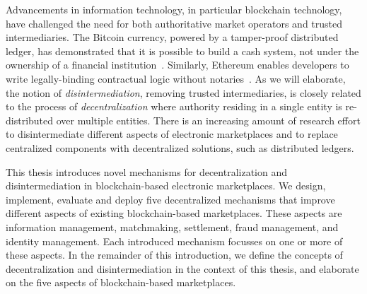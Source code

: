 Advancements in information technology, in particular blockchain technology, have challenged the need for both authoritative market operators and trusted intermediaries.
The Bitcoin currency, powered by a tamper-proof distributed ledger, has demonstrated that it is possible to build a cash system, not under the ownership of a financial institution~\cite{nakamoto2008bitcoin}.
Similarly, Ethereum enables developers to write legally-binding contractual logic without notaries~\cite{wood2014ethereum}.
As we will elaborate, the notion of \emph{disintermediation}, removing trusted intermediaries, is closely related to the process of \emph{decentralization} where authority residing in a single entity is re-distributed over multiple entities.
There is an increasing amount of research effort to disintermediate different aspects of electronic marketplaces and to replace centralized components with decentralized solutions, such as distributed ledgers.


This thesis introduces novel mechanisms for decentralization and disintermediation in blockchain-based electronic marketplaces.
We design, implement, evaluate and deploy five decentralized mechanisms that improve different aspects of existing blockchain-based marketplaces.
These aspects are information management, matchmaking, settlement, fraud management, and identity management.
Each introduced mechanism focusses on one or more of these aspects.
In the remainder of this introduction, we define the concepts of decentralization and disintermediation in the context of this thesis, and elaborate on the five aspects of blockchain-based marketplaces.

